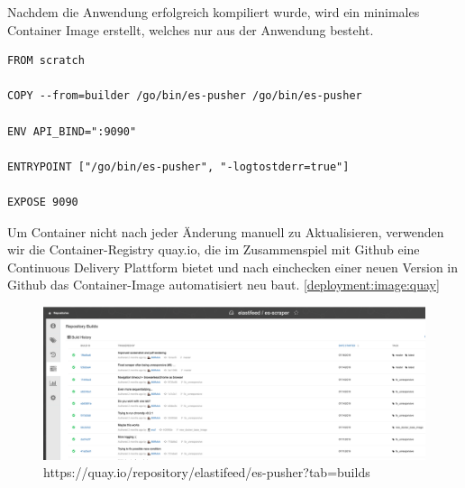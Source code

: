 Nachdem die Anwendung erfolgreich kompiliert wurde, wird ein minimales Container Image erstellt, welches nur aus der Anwendung besteht.

\begin{verbatim}
FROM scratch

COPY --from=builder /go/bin/es-pusher /go/bin/es-pusher

ENV API_BIND=":9090"

ENTRYPOINT ["/go/bin/es-pusher", "-logtostderr=true"]

EXPOSE 9090
\end{verbatim}

Um Container nicht nach jeder Änderung manuell zu Aktualisieren, verwenden wir die Container-Registry quay.io, die im Zusammenspiel mit Github eine Continuous Delivery Plattform bietet und nach einchecken einer neuen Version in Github das Container-Image automatisiert neu baut. \autoref{deployment:image:quay}
\begin{figure}[t]
  \centering
  \includegraphics[width=\linewidth]{images/quay.png}
  \caption{https://quay.io/repository/elastifeed/es-pusher?tab=builds}
  \label{deployment:image:quay}
\end{figure}

